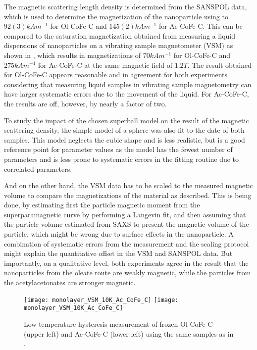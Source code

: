 \documentclass[\main/dresen_thesis.tex]{subfiles}
\begin{document}
    The magnetic scattering length density is determined from the SANSPOL data, which is used to determine the magnetization of the nanoparticle using  to $92(3) \unit{kAm^{-1}}$ for Ol-CoFe-C and $145(2) \unit{kAm^{-1}}$ for Ac-CoFe-C.
    This can be compared to the saturation magnetization obtained from measuring a liquid dispersions of nanoparticles on a vibrating sample magnetometer (VSM) as shown in , which results in magnetizations of $70 \unit{kAm^{-1}}$ for Ol-CoFe-C and $275 \unit{kAm^{-1}}$ for Ac-CoFe-C at the same magnetic field of $1.2 \unit{T}$.
    The result obtained for Ol-CoFe-C appears reasonable and in agreement for both experiments considering that measuring liquid samples in vibrating sample magnetometry can have larger systematic errors due to the movement of the liquid.
    For Ac-CoFe-C, the results are off, however, by nearly a factor of two.

    To study the impact of the chosen superball model on the result of the magnetic scattering density, the simple model of a sphere was also fit to the date of both samples.
    This model neglects the cubic shape and is less realistic, but is a good reference point for parameter values as the model has the fewest number of parameters and is less prone to systematic errors in the fitting routine due to correlated parameters.


    And on the other hand, the VSM data has to be scaled to the measured magnetic volume to compare the magnetizations of the material as described.
    This is being done, by estimating first the particle magnetic moment from the superparamagnetic curve by performing a Langevin fit, and then assuming that the particle volume estimated from SAXS to present the magnetic volume of the particle, which might be wrong due to surface effects in the nanoparticle.
    A combination of systematic errors from the measurement and the scaling protocol might explain the quantitative offset in the VSM and SANSPOL data.
    But importantly, on a qualitative level, both experiments agree in the result that the nanoparticles from the oleate route are weakly magnetic, while the particles from the acetylacetonates are stronger magnetic.

    \begin{figure}[tb]
      \centering
      \texttt{[image: monolayer\_VSM\_10K\_Ac\_CoFe\_C]}
      \texttt{[image: monolayer\_VSM\_10K\_Ac\_CoFe\_C]}
      \caption{\label{fig:monolayers:nanoparticle:vsm10K}Low temperature hysteresis measurement of frozen Ol-CoFe-C (upper left) and Ac-CoFe-C (lower left) using the same samples as in .}
    \end{figure}
    
\end{document}
